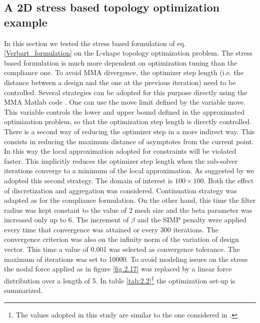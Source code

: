 \subsection{A 2D stress based topology optimization example}
In this section we tested the stress based formulation of eq. \ref{Verbart_formulation} on the L-shape topology optimization problem. The stress based formulation is much more dependent on optimization tuning than the compliance one. To avoid MMA divergence, the optimizer step length (i.e. the distance between a design and the one at the previous iteration) need to be controlled. Several strategies can be adopted for this purpose directly using the MMA Matlab code \cite{svanberg1987method}. One can use the move limit defined by the variable move. This variable controls the lower and upper bound defined in the approximated optimization problem, so that the optimization step length is directly controlled. There is a second way of reducing the optimizer step in a more indirect way. This consists in reducing the maximum distance of asymptotes from the current point. In this way the local approximation adopted for constraints will be violated faster. This implicitly reduces the optimizer step length when the sub-solver iterations converge to a minimum of the local approximation. As suggested by \cite{verbart2017unified} we adopted this second strategy. The domain of interest is $100\times100$. Both the effect of discretization and aggregation was considered.
Continuation strategy was adapted as for the compliance formulation. On the other hand, this time the filter radius was kept constant to the value of 2 mesh size and the beta parameter was increased only up to 6. The increment of $\beta$ and the SIMP penalty were applied every time that convergence was attained or every 300 iterations. The convergence criterion was also on the infinity norm of the variation of design vector. This time a value of 0.001 was selected as convergence tolerance. The maximum of iterations was set to 10000. To avoid modeling issues on the stress the nodal force applied as in figure \ref{fig.2.17} was replaced by a linear force distribution over a length of 5. In table \ref{tab:2.2}\footnote{The values adopted in this study are similar to the one considered in \cite{verbart2017unified}.} the optimization set-up is summarized.
